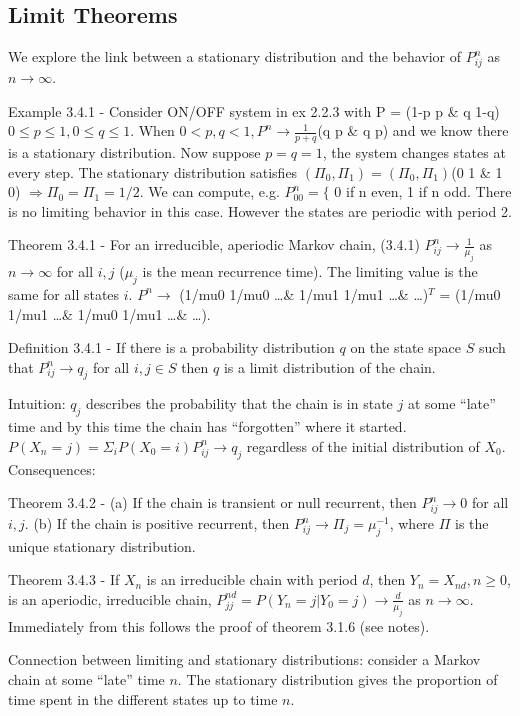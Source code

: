 \documentclass{article}
\begin{document}
\subsection{Limit Theorems}

We explore the link between a stationary distribution and the behavior of $P_{ij}^n$ as $n \rightarrow \infty$.

Example 3.4.1 - Consider ON/OFF system in ex 2.2.3 with P = (1-p p \& q 1-q) $0 \le p \le 1, 0 \le q \le 1$. When $0 < p, q < 1, P^n \rightarrow \frac{1}{p+q}$(q p \& q p) and we know there is a stationary distribution. Now suppose $p = q = 1$, the system changes states at every step. The stationary distribution satisfies $(\Pi_0, \Pi_1) = (\Pi_0, \Pi_1)$(0 1 \& 1 0) $\Rightarrow \Pi_0 = \Pi_1 = 1/2$. We can compute, e.g. $P_{00}^n = \{$ 0 if n even, 1 if n odd. There is no limiting behavior in this case. However the states are periodic with period 2.

Theorem 3.4.1 - For an irreducible, aperiodic Markov chain, (3.4.1) $P_{ij}^n \rightarrow \frac{1}{\mu_j}$ as $n \rightarrow \infty$ for all $i, j$ ($\mu_j$ is the mean recurrence time). The limiting value is the same for all states $i$. $P^n \rightarrow$ (1/mu0 1/mu0 \dots \& 1/mu1 1/mu1 \dots \& \dots)$^T$ = (1/mu0 1/mu1 \dots \& 1/mu0 1/mu1 \dots \& \dots).

Definition 3.4.1 - If there is a probability distribution $q$ on the state space $S$ such that $P_{ij}^n \rightarrow q_j$ for all $i, j \in S$ then $q$ is a limit distribution of the chain.

Intuition: $q_j$ describes the probability that the chain is in state $j$ at some ``late'' time and by this time the chain has ``forgotten'' where it started. $P(X_n=j) = \Sigma_i P(X_0=i) P_{ij}^n \rightarrow q_j$ regardless of the initial distribution of $X_0$. Consequences:

Theorem 3.4.2 - (a) If the chain is transient or null recurrent, then $P_{ij}^n \rightarrow 0$ for all $i, j$. (b) If the chain is positive recurrent, then $P_{ij}^n \rightarrow \Pi_j = \mu_j^{-1}$, where $\Pi$ is the unique stationary distribution.

Theorem 3.4.3 - If $X_n$ is an irreducible chain with period $d$, then $Y_n = X_{nd}, n \ge 0$, is an aperiodic, irreducible chain, $P_{jj}^{nd} = P(Y_n=j | Y_0=j) \rightarrow \frac{d}{\mu_j}$ as $n \rightarrow \infty$. Immediately from this follows the proof of theorem 3.1.6 (see notes).

Connection between limiting and stationary distributions: consider a Markov chain at some ``late'' time $n$. The stationary distribution gives the proportion of time spent in the different states up to time $n$.
\end{document}
